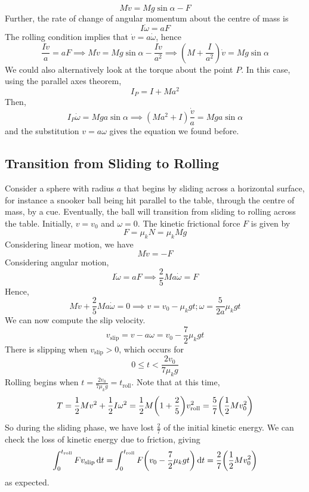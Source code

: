 \[ M\dot v = Mg\sin\alpha - F \]
Further, the rate of change of angular momentum about the centre of mass is
\[ I \dot\omega = aF \]
The rolling condition implies that \(\dot v = a \dot\omega\), hence
\[ \frac{I\dot v}{a} = aF \implies M\dot v = Mg\sin\alpha - \frac{I\dot v}{a^2} \implies \left( M + \frac{I}{a^2} \right)\dot v = Mg\sin\alpha \]
We could also alternatively look at the torque about the point \(P\). In this case, using the parallel axes theorem,
\[ I_P = I + Ma^2 \]
Then,
\[ I_P \dot\omega = Mga\sin\alpha \implies (M a^2 + I)\frac{\dot v}{a} = Mga\sin\alpha \]
and the substitution \(v = a\omega\) gives the equation we found before.

\subsection{Transition from Sliding to Rolling}
Consider a sphere with radius \(a\) that begins by sliding across a horizontal surface, for instance a snooker ball being hit parallel to the table, through the centre of mass, by a cue. Eventually, the ball will transition from sliding to rolling across the table. Initially, \(v = v_0\) and \(\omega = 0\). The kinetic frictional force \(F\) is given by
\[ F = \mu_k N = \mu_k Mg \]
Considering linear motion, we have
\[ M \dot v = -F \]
Considering angular motion,
\[ I\dot\omega = aF \implies \frac{2}{5}Ma \dot\omega = F \]
Hence,
\[ M\dot v +\frac{2}{5}Ma \dot\omega = 0 \implies v = v_0 - \mu_k g t; \omega = \frac{5}{2a}\mu_k g t \]
We can now compute the slip velocity.
\[ v_\text{slip} = v - a\omega = v_0 - \frac{7}{2}\mu_k gt \]
There is slipping when \(v_\text{slip} > 0\), which occurs for
\[ 0 \leq t < \frac{2v_0}{7\mu_k g} \]
Rolling begins when \(t = \frac{2v_0}{7\mu_k g} = t_\text{roll}\). Note that at this time,
\[ T = \frac{1}{2}Mv^2 + \frac{1}{2}I\omega^2 = \frac{1}{2}M\qty(1 + \frac{2}{5})v_\text{roll}^2 = \frac{5}{7}\qty( \frac{1}{2} Mv_0^2 ) \]
So during the sliding phase, we have lost \(\frac{2}{7}\) of the initial kinetic energy. We can check the loss of kinetic energy due to friction, giving
\[ \int_0^{t_\text{roll}} F v_\text{slip} \dd{t} = \int_0^{t_\text{roll}} F \qty(v_0 - \frac{7}{2}\mu_k gt) \dd{t} = \frac{2}{7}\qty(\frac{1}{2}Mv_0^2) \]
as expected.
